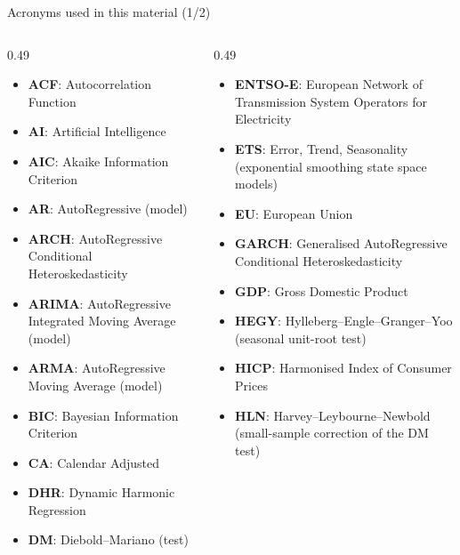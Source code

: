 
{
\begin{frame}[noframenumbering]
    \titlepage
\end{frame}
}
\begin{frame}{Acronyms used in this material (1/2)}
\begin{columns}[T]
\begin{column}{0.49\textwidth}
\begin{itemize}\setlength{\itemsep}{0pt}
    \item \textbf{ACF}: Autocorrelation Function
    \item \textbf{AI}: Artificial Intelligence
    \item \textbf{AIC}: Akaike Information Criterion
    \item \textbf{AR}: AutoRegressive (model)
    \item \textbf{ARCH}: AutoRegressive Conditional Heteroskedasticity
    \item \textbf{ARIMA}: AutoRegressive Integrated Moving Average (model)
    \item \textbf{ARMA}: AutoRegressive Moving Average (model)
    \item \textbf{BIC}: Bayesian Information Criterion
    \item \textbf{CA}: Calendar Adjusted
    \item \textbf{DHR}: Dynamic Harmonic Regression
    \item \textbf{DM}: Diebold–Mariano (test)
\end{itemize}
\end{column}
\begin{column}{0.49\textwidth}
\begin{itemize}\setlength{\itemsep}{0pt}
    \item \textbf{ENTSO-E}: European Network of Transmission System Operators for Electricity
    \item \textbf{ETS}: Error, Trend, Seasonality (exponential smoothing state space models)
    \item \textbf{EU}: European Union
    \item \textbf{GARCH}: Generalised AutoRegressive Conditional Heteroskedasticity
    \item \textbf{GDP}: Gross Domestic Product
    \item \textbf{HEGY}: Hylleberg–Engle–Granger–Yoo (seasonal unit-root test)
    \item \textbf{HICP}: Harmonised Index of Consumer Prices
    \item \textbf{HLN}: Harvey–Leybourne–Newbold (small-sample correction of the DM test)
\end{itemize}
\end{column}
\end{columns}
\end{frame}
